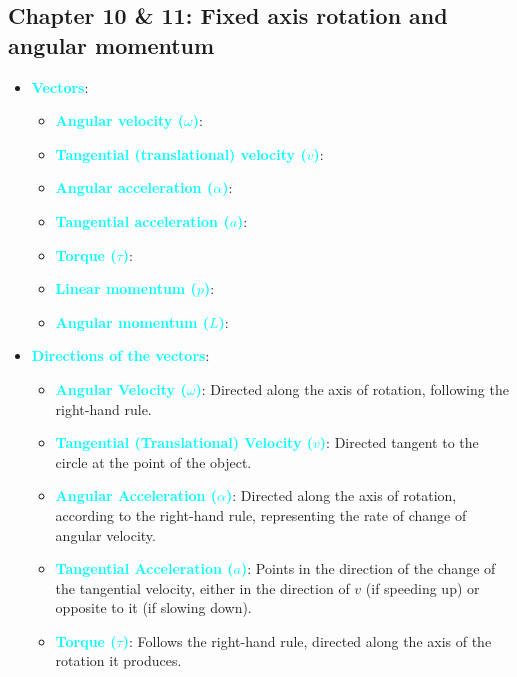 \documentclass{report}
\begin{document}
\begin{itemize}
    \end{itemize}

    \pagebreak 
    \subsection{Chapter 10 \& 11: Fixed axis rotation and angular momentum}
    \begin{itemize}
        \item \textbf{\textcolor{cyan}{Vectors}}:
            \begin{itemize}
                \item \textbf{\textcolor{cyan}{Angular velocity ($\omega$)}}:
                \item \textbf{\textcolor{cyan}{Tangential (translational) velocity ($v$)}}:
                \item \textbf{\textcolor{cyan}{Angular acceleration ($\alpha$)}}:
                \item \textbf{\textcolor{cyan}{Tangential acceleration ($a$)}}:
                \item \textbf{\textcolor{cyan}{Torque ($\tau$)}}:
                \item \textbf{\textcolor{cyan}{Linear momentum ($p$)}}:
                \item \textbf{\textcolor{cyan}{Angular momentum ($L$)}}:
            \end{itemize}
        \item \textbf{\textcolor{cyan}{Directions of the vectors}}:
            \begin{itemize}
                \item \textbf{\textcolor{cyan}{Angular Velocity (\(\omega\))}}: Directed along the axis of rotation, following the right-hand rule.
                \item \textbf{\textcolor{cyan}{Tangential (Translational) Velocity (\(v\))}}: Directed tangent to the circle at the point of the object.
                \item \textbf{\textcolor{cyan}{Angular Acceleration (\(\alpha\))}}: Directed along the axis of rotation, according to the right-hand rule, representing the rate of change of angular velocity.
                \item \textbf{\textcolor{cyan}{Tangential Acceleration (\(a\))}}: Points in the direction of the change of the tangential velocity, either in the direction of \(v\) (if speeding up) or opposite to it (if slowing down).
                \item \textbf{\textcolor{cyan}{Torque (\(\tau\))}}: Follows the right-hand rule, directed along the axis of the rotation it produces.

\end{itemize}
\end{itemize}
\end{document}
